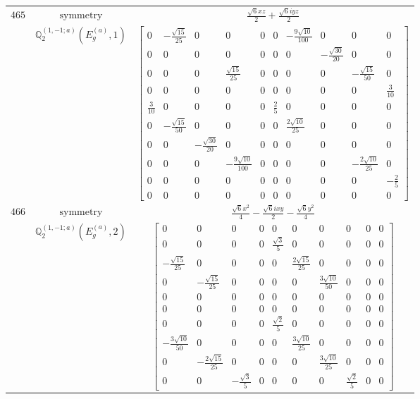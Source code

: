 \documentclass[fleqn,8pt,landscape]{jsarticle}
\begin{document}
\begin{longtable}{ccc}
$ 465 $ & $ \text{symmetry} $ & $ \frac{\sqrt{6} x z}{2} + \frac{\sqrt{6} i y z}{2} $ \\
$  $ & $ \mathbb{Q}_{2}^{(1,-1;a)}(E_{g}^{(a)},1) $ & $ \begin{bmatrix} 0 & - \frac{\sqrt{15}}{25} & 0 & 0 & 0 & 0 & - \frac{9 \sqrt{10}}{100} & 0 & 0 & 0 \\ 0 & 0 & 0 & 0 & 0 & 0 & 0 & - \frac{\sqrt{30}}{20} & 0 & 0 \\ 0 & 0 & 0 & \frac{\sqrt{15}}{25} & 0 & 0 & 0 & 0 & - \frac{\sqrt{15}}{50} & 0 \\ 0 & 0 & 0 & 0 & 0 & 0 & 0 & 0 & 0 & \frac{3}{10} \\ \frac{3}{10} & 0 & 0 & 0 & 0 & \frac{2}{5} & 0 & 0 & 0 & 0 \\ 0 & - \frac{\sqrt{15}}{50} & 0 & 0 & 0 & 0 & \frac{2 \sqrt{10}}{25} & 0 & 0 & 0 \\ 0 & 0 & - \frac{\sqrt{30}}{20} & 0 & 0 & 0 & 0 & 0 & 0 & 0 \\ 0 & 0 & 0 & - \frac{9 \sqrt{10}}{100} & 0 & 0 & 0 & 0 & - \frac{2 \sqrt{10}}{25} & 0 \\ 0 & 0 & 0 & 0 & 0 & 0 & 0 & 0 & 0 & - \frac{2}{5} \\ 0 & 0 & 0 & 0 & 0 & 0 & 0 & 0 & 0 & 0 \end{bmatrix} $ \\ \hline
$ 466 $ & $ \text{symmetry} $ & $ \frac{\sqrt{6} x^{2}}{4} - \frac{\sqrt{6} i x y}{2} - \frac{\sqrt{6} y^{2}}{4} $ \\
$  $ & $ \mathbb{Q}_{2}^{(1,-1;a)}(E_{g}^{(a)},2) $ & $ \begin{bmatrix} 0 & 0 & 0 & 0 & 0 & 0 & 0 & 0 & 0 & 0 \\ 0 & 0 & 0 & 0 & \frac{\sqrt{3}}{5} & 0 & 0 & 0 & 0 & 0 \\ - \frac{\sqrt{15}}{25} & 0 & 0 & 0 & 0 & \frac{2 \sqrt{15}}{25} & 0 & 0 & 0 & 0 \\ 0 & - \frac{\sqrt{15}}{25} & 0 & 0 & 0 & 0 & \frac{3 \sqrt{10}}{50} & 0 & 0 & 0 \\ 0 & 0 & 0 & 0 & 0 & 0 & 0 & 0 & 0 & 0 \\ 0 & 0 & 0 & 0 & 0 & 0 & 0 & 0 & 0 & 0 \\ 0 & 0 & 0 & 0 & \frac{\sqrt{2}}{5} & 0 & 0 & 0 & 0 & 0 \\ - \frac{3 \sqrt{10}}{50} & 0 & 0 & 0 & 0 & \frac{3 \sqrt{10}}{25} & 0 & 0 & 0 & 0 \\ 0 & - \frac{2 \sqrt{15}}{25} & 0 & 0 & 0 & 0 & \frac{3 \sqrt{10}}{25} & 0 & 0 & 0 \\ 0 & 0 & - \frac{\sqrt{3}}{5} & 0 & 0 & 0 & 0 & \frac{\sqrt{2}}{5} & 0 & 0 \end{bmatrix} $ \\ \hline

\end{longtable}
\end{document}
